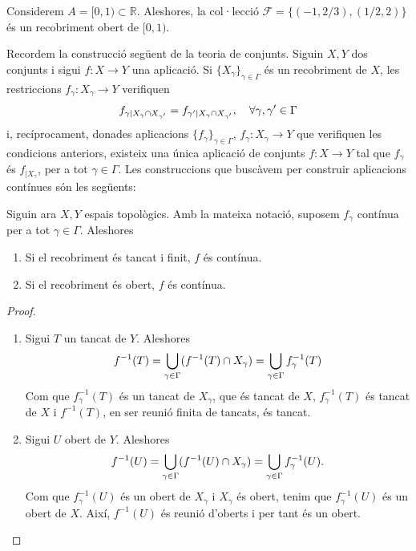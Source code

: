\documentclass[../main.tex]{subfiles}
\begin{document}
\begin{ej}
\label{ej:recobriment3} Considerem $A = [0,1)\subset\mathbb{R}$. Aleshores, la col·lecció $\mathcal{F} = \{(-1,2/3),(1/2,2)\}$ és un recobriment obert de $[0,1)$.
\end{ej}

Recordem la construcció següent de la teoria de conjunts. Siguin $X,Y$ dos conjunts i sigui $f:X\rightarrow Y$ una aplicació. Si $\{X_\gamma\}_{\gamma\in \Gamma}$ és un recobriment de $X$, les restriccions $f_\gamma:X_\gamma\rightarrow Y$ verifiquen
\begin{equation}
    \notag
    f_{\gamma|X_\gamma\cap X_{\gamma'}} = f_{\gamma'|X_\gamma\cap X_{\gamma'}},\quad \forall \gamma,\gamma'\in \Gamma 
\end{equation}
i, recíprocament, donades aplicacions $\{f_\gamma\}_{\gamma\in\Gamma}$, $f_\gamma:X_\gamma\rightarrow Y$ que verifiquen les condicions anteriors, existeix una única aplicació de conjunts $f:X\rightarrow Y$ tal que $f_\gamma$ és $f_{|X_\gamma}$, per a tot $\gamma\in\Gamma$. Les construccions que buscàvem per construir aplicacions contínues són les següents:
\begin{prop}
\label{prop:recobrimentsiappcontinues} Siguin ara $X,Y$ espais topològics. Amb la mateixa notació, suposem $f_\gamma$ contínua per a tot $\gamma\in\Gamma$. Aleshores
\begin{enumerate}[(1)]
    \item Si el recobriment és tancat i finit, $f$ és contínua.
    \item Si el recobriment és obert, $f$ és contínua.
\end{enumerate}
\end{prop}
\begin{proof}
\begin{enumerate}[(1)]
    \item Sigui $T$ un tancat de $Y$. Aleshores
    \begin{equation}
        \notag
        f^{-1}(T) = \bigcup_{\gamma\in\Gamma}(f^{-1}(T)\cap X_\gamma) = \bigcup_{\gamma\in\Gamma}f_\gamma^{-1}(T)
    \end{equation}
    Com que $f_\gamma^{-1}(T)$ és un tancat de $X_\gamma$, que és tancat de $X$, $f_\gamma^{-1}(T)$ és tancat de $X$ i $f^{-1}(T)$, en ser reunió finita de tancats, és tancat.
    \item Sigui $U$ obert de $Y$. Aleshores
    \begin{equation}
        \notag
        f^{-1}(U)=\bigcup_{\gamma\in\Gamma}(f^{-1}(U)\cap X_\gamma) = \bigcup_{\gamma\in\Gamma}f_\gamma^{-1}(U).
    \end{equation}
    Com que $f_\gamma^{-1}(U)$ és un obert de $X_\gamma$ i $X_\gamma$ és obert, tenim que $f_\gamma^{-1}(U)$ és un obert de $X$. Així, $f^{-1}(U)$ és reunió d'oberts i per tant és un obert.
\end{enumerate}
\end{proof}
\end{document}
